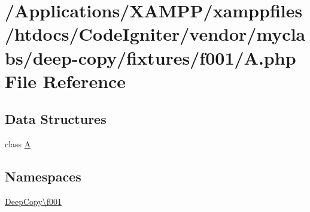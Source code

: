 \hypertarget{f001_2_a_8php}{}\section{/\+Applications/\+X\+A\+M\+P\+P/xamppfiles/htdocs/\+Code\+Igniter/vendor/myclabs/deep-\/copy/fixtures/f001/A.php File Reference}
\label{f001_2_a_8php}
\subsection*{Data Structures}
\begin{DoxyCompactItemize}
\item 
class \mbox{\hyperlink{class_deep_copy_1_1f001_1_1_a}{A}}
\end{DoxyCompactItemize}
\subsection*{Namespaces}
\begin{DoxyCompactItemize}
\item 
 \mbox{\hyperlink{namespace_deep_copy_1_1f001}{Deep\+Copy\textbackslash{}f001}}
\end{DoxyCompactItemize}
